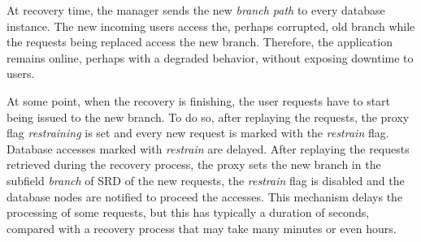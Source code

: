 At recovery time, the manager sends the new \emph{branch path} to every database instance. The new incoming users access the, perhaps corrupted, old branch while the requests being replaced access the new branch. Therefore, the application remains online, perhaps with a degraded behavior, without exposing downtime to users.

At some point, when the recovery is finishing, the user requests have to start being issued to the new branch. To do so, after replaying the requests, the proxy flag \emph{restraining} is set and every new request is marked with the \emph{restrain} flag. Database accesses marked with \emph{restrain} are delayed. After replaying the requests retrieved during the recovery process, the proxy sets the new branch in the subfield \emph{branch} of \ac{SRD} of the new requests, the \emph{restrain} flag is disabled and the database nodes are notified to proceed the accesses. This mechanism delays the processing of some requests, but this has typically a duration of seconds, compared with a recovery process that may take many minutes or even hours.